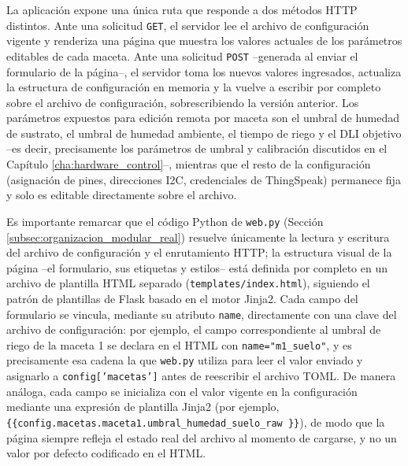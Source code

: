 La aplicación expone una única ruta que responde a dos métodos HTTP distintos. Ante una solicitud \texttt{GET}, el servidor lee el archivo de configuración vigente y renderiza una página que muestra los valores actuales de los parámetros editables de cada maceta. Ante una solicitud \texttt{POST} --generada al enviar el formulario de la página--, el servidor toma los nuevos valores ingresados, actualiza la estructura de configuración en memoria y la vuelve a escribir por completo sobre el archivo de configuración, sobrescribiendo la versión anterior. Los parámetros expuestos para edición remota por maceta son el umbral de humedad de sustrato, el umbral de humedad ambiente, el tiempo de riego y el DLI objetivo --es decir, precisamente los parámetros de umbral y calibración discutidos en el Capítulo \ref{cha:hardware_control}--, mientras que el resto de la configuración (asignación de pines, direcciones I2C, credenciales de ThingSpeak) permanece fija y solo es editable directamente sobre el archivo.

Es importante remarcar que el código Python de \texttt{web.py} (Sección \ref{subsec:organizacion_modular_real}) resuelve únicamente la lectura y escritura del archivo de configuración y el enrutamiento HTTP; la estructura visual de la página --el formulario, sus etiquetas y estilos-- está definida por completo en un archivo de plantilla HTML separado (\texttt{templates/index.html}), siguiendo el patrón de plantillas de Flask basado en el motor Jinja2. Cada campo del formulario se vincula, mediante su atributo \texttt{name}, directamente con una clave del archivo de configuración: por ejemplo, el campo correspondiente al umbral de riego de la maceta 1 se declara en el HTML con \texttt{name="m1\_suelo"}, y es precisamente esa cadena la que \texttt{web.py} utiliza para leer el valor enviado y asignarlo a \texttt{config['macetas']\allowbreak['maceta1']} antes de reescribir el archivo TOML. De manera análoga, cada campo se inicializa con el valor vigente en la configuración mediante una expresión de plantilla Jinja2 (por ejemplo, \texttt{\{\{\allowbreak config.macetas.maceta1.\allowbreak umbral\_humedad\_suelo\_raw \}\}}), de modo que la página siempre refleja el estado real del archivo al momento de cargarse, y no un valor por defecto codificado en el HTML.

